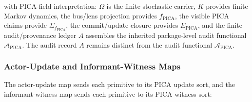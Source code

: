 \documentclass[11pt]{article}
\theoremstyle{definition}
\begin{document}
with PICA-field interpretation: \(\Omega\) is the finite stochastic carrier, \(K\) provides finite Markov dynamics, the bus/lens projection provides \(f_{\mathrm{PICA}}\), the visible PICA claims provide \(\Sigma_{f_{\mathrm{PICA}}}\), the commit/update closure provides \(E_{\mathrm{PICA}}\), and the finite audit/provenance ledger \(A\) assembles the inherited package-level audit functional \(\mathcal A_{\mathrm{PICA}}\). The audit record \(A\) remains distinct from the audit functional \(\mathcal A_{\mathrm{PICA}}\).

\subsubsection{Actor-Update and Informant-Witness Maps}

The actor-update map sends each primitive to its PICA update sort, and the informant-witness map sends each primitive to its PICA witness sort:
\end{document}
